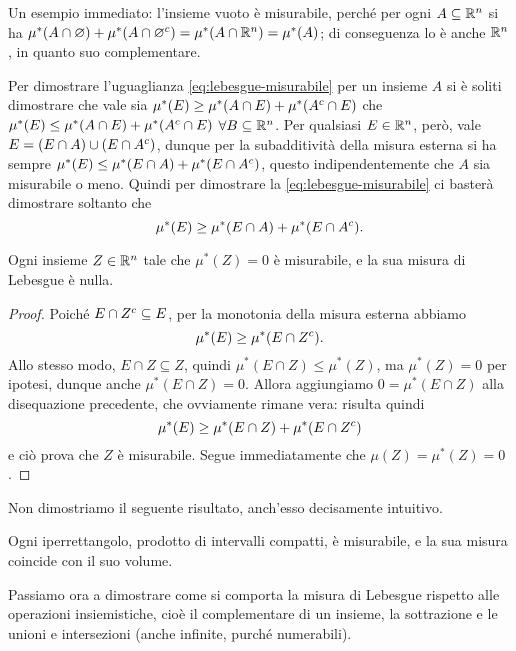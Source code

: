 Un esempio immediato: l'insieme vuoto è misurabile, perch\'e per ogni $A\subseteq\mathbb{R}^n$ si ha $\mu^*(A\cap\varnothing)+\mu^*(A\cap{\varnothing}^c)=\mu^*(A\cap\mathbb{R}^n)=\mu^*(A)$; di conseguenza lo è anche $\mathbb{R}^n$, in quanto suo complementare.
\begin{osservazione}
	Per dimostrare l'uguaglianza \eqref{eq:lebesgue-misurabile} per un insieme $A$ si è soliti dimostrare che vale sia $\mu^*(E)\geq\mu^*(A\cap E)+\mu^*({A}^c\cap E)$ che $\mu^*(E)\leq\mu^*(A\cap E)+\mu^*({A}^c\cap E)$ $\forall B\subseteq\mathbb{R}^n$.
	Per qualsiasi $E\in\mathbb{R}^n$, però, vale $E=(E\cap A)\cup(E\cap{A}^c)$, dunque per la subadditività della misura esterna si ha sempre $\mu^*(E)\leq\mu^*(E\cap A)+\mu^*(E\cap{A}^c)$, questo indipendentemente che $A$ sia misurabile o meno.
	Quindi per dimostrare la \eqref{eq:lebesgue-misurabile}  ci basterà dimostrare soltanto che
	\begin{equation}
		\mu^*(E)\geq\mu^*(E\cap A)+\mu^*(E\cap{A}^c).
	\end{equation}
\end{osservazione}
\begin{proprieta} \label{pr:misura-nulla}
	Ogni insieme $Z\in\mathbb{R}^n$ tale che $\mu^*(Z)=0$ è misurabile, e la sua misura di Lebesgue è nulla.
\end{proprieta}
\begin{proof}
	Poich\'e $E\cap{Z}^c\subseteq E$, per la monotonia della misura esterna abbiamo
	\begin{equation}
		\mu^*(E)\geq\mu^*(E\cap{Z}^c).
	\end{equation}
	Allo stesso modo, $E\cap Z\subseteq Z$, quindi $\mu^*(E\cap Z)\leq\mu^*(Z)$, ma $\mu^*(Z)=0$ per ipotesi, dunque anche $\mu^*(E\cap Z)=0$.
	Allora aggiungiamo $0=\mu^*(E\cap Z)$ alla disequazione precedente, che ovviamente rimane vera: risulta quindi
	\begin{equation}
		\mu^*(E)\geq\mu^*(E\cap Z)+\mu^*(E\cap{Z}^c)
	\end{equation}
	e ciò prova che $Z$ è misurabile.
	Segue immediatamente che $\mu(Z)=\mu^*(Z)=0$.
\end{proof}
Non dimostriamo il seguente risultato, anch'esso decisamente intuitivo.
\begin{proprieta} \label{pr:misura-iperrettangolo}
	Ogni iperrettangolo, prodotto di intervalli compatti, è misurabile, e la sua misura coincide con il suo volume.
\end{proprieta}
Passiamo ora a dimostrare come si comporta la misura di Lebesgue rispetto alle operazioni insiemistiche, cioè il complementare di un insieme, la sottrazione e le unioni e intersezioni (anche infinite, purch\'e numerabili).
